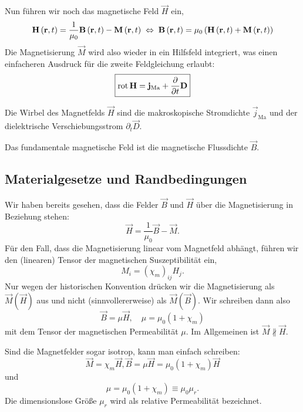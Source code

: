 Nun führen wir noch das magnetische Feld $\vec {H}$ ein,
\begin{equation*}
	\mathbf{H}\left(\mathbf{r},t\right)=\frac{1}{\mu _{0}}\mathbf{B}\left(\mathbf{r},t\right)-\mathbf{M}\left(\mathbf{r},t\right)\;\Leftrightarrow\; \mathbf{B}\left(\mathbf{r},t\right)=\mu _{0}\left(\mathbf{H}\left(\mathbf{r},t\right)+\mathbf{M}\left(\mathbf{r},t\right)\right)
\end{equation*}
Die Magnetisierung $\vec {M}$ wird also wieder in ein Hilfsfeld integriert, was einen einfacheren Ausdruck für die zweite Feldgleichung erlaubt:
\begin{equation*}
	\boxed{\operatorname{rot} \mathbf{H}=\mathbf{j}_{\mathrm{Ma}}+\frac{\partial }{\partial t}\mathbf{D}}
\end{equation*}

\begin{formal}
	Die Wirbel des Magnetfelds $\vec {H}$ sind die makroskopische Stromdichte $\vec {j}_{\mathrm{Ma}}$ und der dielektrische Verschiebungsstrom $\partial _{t}\vec {D}$.
\end{formal}

Das fundamentale magnetische Feld ist die magnetische Flussdichte $\vec {B}$.


\subsection{Materialgesetze und Randbedingungen}

Wir haben bereits gesehen, dass die Felder $\vec {B}$ und $\vec {H}$ über die Magnetisierung in Beziehung stehen:
\begin{equation*}
	\vec {H}=\frac{1}{\mu _{0}}\vec {B}-\vec {M}.
\end{equation*}
Für den Fall, dass die Magnetisierung linear vom Magnetfeld abhängt, führen wir den (linearen) Tensor der magnetischen Suszeptibilität ein,
\begin{equation*}
	M_{i}=\left(\chi _{m}\right)_{ij}H_{j}.
\end{equation*}
Nur wegen der historischen Konvention drücken wir die Magnetisierung als $\vec {M}\left(\vec {H}\right)$ aus und nicht (sinnvollererweise) als $\vec {M}\left(\vec {B}\right)$. Wir schreiben dann also
\begin{equation*}
	\vec {B}=\mu \vec {H}, \quad \mu =\mu _{0}\left(1+\chi _{m}\right)
\end{equation*}
mit dem Tensor der magnetischen Permeabilität $\mu $. Im Allgemeinen ist $\vec {M}\nparallel \vec {H}$.

Sind die Magnetfelder sogar isotrop, kann man einfach schreiben:
\begin{equation*}
	\vec {M}=\chi _{m}\vec {H}, \vec {B}=\mu \vec {H}=\mu _{0}\left(1+\chi _{m}\right)\vec {H}
\end{equation*}
und
\begin{equation*}
	\mu =\mu _{0}\left(1+\chi _{m}\right)\equiv \mu _{0}\mu _{r}.
\end{equation*}
Die dimensionslose Größe $\mu _{r}$ wird als relative Permeabilität bezeichnet.

